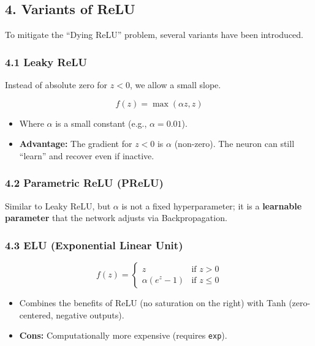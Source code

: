 \documentclass[
  italian,
  11pt,
]{article}
\begin{document}
\subsection{4. Variants of ReLU}\label{variants-of-relu}

To mitigate the ``Dying ReLU'' problem, several variants have been
introduced.

\subsubsection{4.1 Leaky ReLU}\label{leaky-relu}

Instead of absolute zero for \(z < 0\), we allow a small slope.

\[f(z) = \max(\alpha z, z)\]

\begin{itemize}
\item
  Where \(\alpha\) is a small constant (e.g., \(\alpha = 0.01\)).
\item
  \textbf{Advantage:} The gradient for \(z < 0\) is \(\alpha\)
  (non-zero). The neuron can still ``learn'' and recover even if
  inactive.
\end{itemize}

\subsubsection{4.2 Parametric ReLU (PReLU)}\label{parametric-relu-prelu}

Similar to Leaky ReLU, but \(\alpha\) is not a fixed hyperparameter; it
is a \textbf{learnable parameter} that the network adjusts via
Backpropagation.

\subsubsection{4.3 ELU (Exponential Linear
Unit)}\label{elu-exponential-linear-unit}

\[f(z) = \begin{cases} z & \text{if } z > 0 \\ \alpha (e^z - 1) & \text{if } z \leq 0 \end{cases}\]

\begin{itemize}
\item
  Combines the benefits of ReLU (no saturation on the right) with Tanh
  (zero-centered, negative outputs).
\item
  \textbf{Cons:} Computationally more expensive (requires \texttt{exp}).
\end{itemize}
\end{document}
